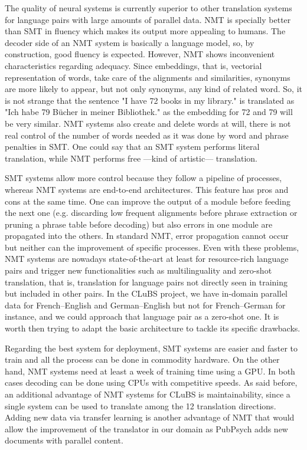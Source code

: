 \documentclass[a4paper,11pt]{article}
\begin{document}
The quality of neural systems is currently superior to other translation systems for language pairs with large amounts of parallel data.
NMT is specially better than SMT in fluency which makes its output more appealing to humans. The decoder side of an NMT system is basically a language model, so, by construction, good fluency is expected. However, NMT shows inconvenient characteristics regarding adequacy. Since embeddings, that is, vectorial representation of words, take care of the alignments and similarities, synonyms are more likely to appear, but not only synonyms, any kind of related word. So, it is not strange that the sentence "I have 72 books in my library." is translated as "Ich habe 79 Bücher in meiner Bibliothek." as the embedding for 72 and 79 will be very similar. NMT systems also create and delete words at will, there is not real control of the number of words needed as it was done by word and phrase penalties in SMT. One could say that an SMT system performs literal translation, while NMT performs free ---kind of artistic--- translation.

SMT systems allow more control because they follow a pipeline of processes, whereas NMT systems are end-to-end architectures. This feature has pros and cons at the same time. One can improve the output of a module before feeding the next one (e.g. discarding low frequent alignments before phrase extraction or pruning a phrase table before decoding) but also errors in one module are propagated into the others. In standard NMT, error propagation cannot occur but neither can the improvement of specific processes. Even with these problems, NMT systems are nowadays state-of-the-art at least for resource-rich language pairs and trigger new functionalities such as multilinguality and zero-shot translation, that is, translation for language pairs not directly seen in training but included in other pairs. In the CLuBS project, we have in-domain parallel data for French--English and German--English but not for French--German for instance, and we could approach that language pair as a zero-shot one. It is worth then trying to adapt the basic architecture to tackle its specific drawbacks.

Regarding the best system for deployment, SMT systems are easier and faster to train and all the process can be done in commodity hardware. On the other hand, NMT systems need at least a week of training time using a GPU. In both cases decoding can be done using CPUs with competitive speeds. As said before, an additional advantage of NMT systems for CLuBS is maintainability, since a single system can be used to translate among the 12 translation directions. Adding new data via transfer learning is another advantage of NMT that would allow the improvement of the translator in our domain as PubPsych adds new documents with parallel content.
\end{document}
